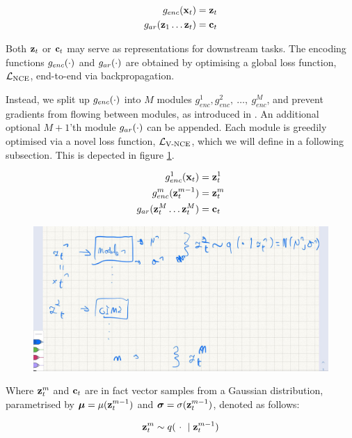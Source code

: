 		\begin{align} %
			g_{enc}(\xt) &= \zt \\
			g_{ar}(\z_1  \dots \zt) &= \ct
		\end{align}
		
			Both $\mathbf{z}_t$ or $\mathbf{c}_t$ may serve as representations for downstream tasks. The encoding functions $g_{enc}(\cdot)$ and $g_{ar}(\cdot)$ are obtained by optimising a global loss function, $\mathcal{L}_{\text{NCE}}$, end-to-end via backpropagation. 
			
			Instead, we split up $g_{enc}(\cdot)$ into $M$ modules $g_{enc}^1, g_{enc}^2,~\dots,~g_{enc}^M$, and prevent gradients from flowing between modules, as introduced in \cite{lowePuttingEndEndtoEnd2020}. An additional optional $M+1$'th module $g_{ar}(\cdot)$ can be appended. Each module is greedily optimised via a novel loss function, $\mathcal{L}_{\text{V-NCE}}$, which we will define in a following subsection.
			This is depected in figure \ref{fig:variationalgim}.
			
			
			\begin{align} %
				g_{enc}^1(\xt) &= \zt^1 \\
				g_{enc}^m(\zt^{m-1}) &= \zt^m \\
				g_{ar}(\z_t^M \dots \zt^M) &= \ct
			\end{align}
		
		\begin{figure} %
			\centering
			\includegraphics[width=0.7\linewidth]{temp_variational_gim}
			\caption{}
			\label{fig:variationalgim}
		\end{figure}
		
		
		
		
			Where $\mathbf{z}_t^m$ and $\mathbf{c}_t$ are in fact vector samples from a Gaussian distribution, parametrised by $\bm{\mu} = \mu(\mathbf{z}_t^{m-1})$ and $\bm{\sigma} = \sigma(\mathbf{z}_t^{m-1})$, denoted as follows:
			
			\begin{align} %
				\sample{\zt^m} \sampleqdot{\zt^{m-1}}
			\end{align}
	
